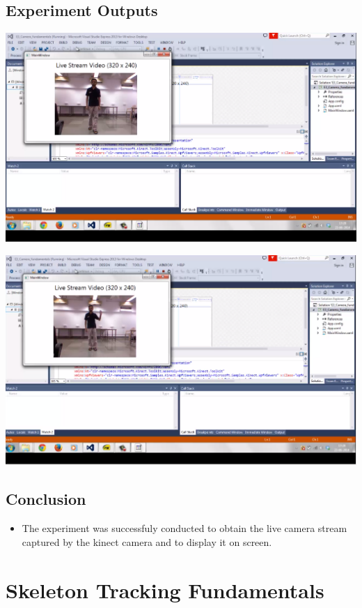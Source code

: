 \begin{flushleft}
\subsection{\textbf{ Experiment Outputs}}
\includegraphics[scale = 0.5]{e31}

\medskip
\includegraphics[scale = 0.5]{e32}
\medskip
\subsection{\textbf{ Conclusion}}
\begin{itemize}
\item The experiment was successfuly conducted to obtain the live camera stream captured by the kinect camera and to display it on screen.
\end{itemize}
\newpage

\section{\textbf{ Skeleton Tracking Fundamentals}}
\label{4.4}


\end{flushleft}
